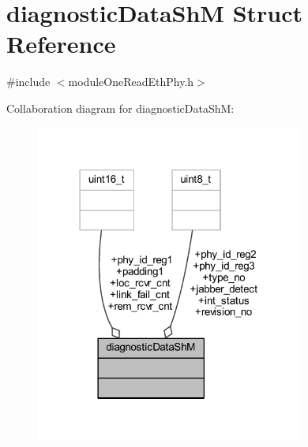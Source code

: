 \hypertarget{structdiagnostic_data_sh_m}{}\section{diagnostic\+Data\+ShM Struct Reference}
\label{structdiagnostic_data_sh_m}


{\ttfamily \#include $<$module\+One\+Read\+Eth\+Phy.\+h$>$}



Collaboration diagram for diagnostic\+Data\+ShM\+:
\nopagebreak
\begin{figure}[H]
\begin{center}
\leavevmode
\includegraphics[width=250pt]{structdiagnostic_data_sh_m__coll__graph}
\end{center}
\end{figure}
